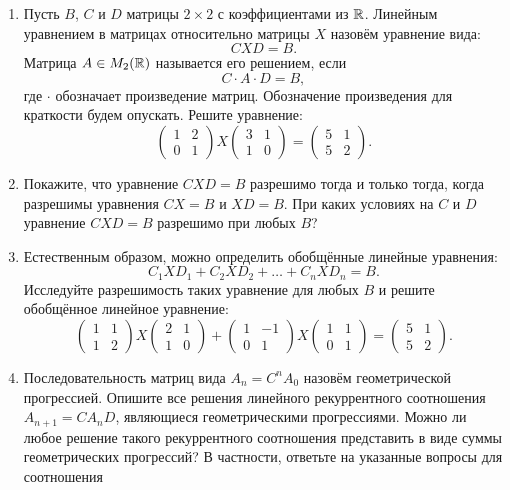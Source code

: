 
\begin{enumerate}
\item Пусть $B$, $C$ и $D$ матрицы $2\times 2$ с коэффициентами из $\mathbb{R}$. Линейным уравнением в матрицах относительно матрицы $X$ назовём уравнение вида: 
$$CXD=B.$$
Матрица $A\in M_2(\mathbb{R})$ называется его решением, если 
$$C\cdot A\cdot D=B,$$
где $\cdot$ обозначает произведение матриц. Обозначение произведения для краткости будем опускать.
Решите уравнение:
$$\left(\begin{smallmatrix} 1&2\\ 0&1 \end{smallmatrix}\right) X \left(\begin{smallmatrix} 3&1\\ 1&0 \end{smallmatrix}\right) =
\left(\begin{smallmatrix} 5&1\\ 5&2 \end{smallmatrix}\right) .$$
\item Покажите, что уравнение $CXD=B$ разрешимо тогда и только тогда, когда разрешимы уравнения $CX=B$ и $XD=B$. При каких условиях на $C$ и $D$ уравнение $CXD=B$ разрешимо при любых $B$?
\item Естественным образом, можно определить обобщённые линейные уравнения:
$$C_1 X D_1+ C_2 X D_2+\dots+ C_n X D_n=B.$$
Исследуйте разрешимость таких уравнение для любых $B$ и решите обобщённое линейное уравнение:
$$\left(\begin{smallmatrix} 1&1\\ 1&2 \end{smallmatrix}\right) X \left(\begin{smallmatrix} 2&1\\ 1&0 \end{smallmatrix}\right) + \left(\begin{smallmatrix} 1&-1\\ 0&1 \end{smallmatrix}\right) X \left(\begin{smallmatrix} 1&1\\ 0&1 \end{smallmatrix}\right) =
\left(\begin{smallmatrix} 5&1\\ 5&2 \end{smallmatrix}\right).$$
\item Последовательность матриц вида $A_n=C^nA_0$ назовём геометрической прогрессией. Опишите все решения линейного рекуррентного соотношения $A_{n+1}=CA_nD$, являющиеся геометрическими прогрессиями. Можно ли любое решение такого рекуррентного соотношения представить в виде суммы геометрических прогрессий? В частности, ответьте на указанные вопросы для соотношения

\end{enumerate}
